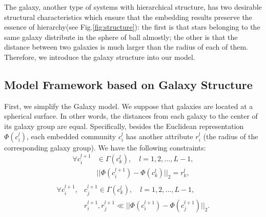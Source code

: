 \documentclass{article}
\theoremstyle{definition}
\begin{document}
	 The galaxy, another type of systems with hierarchical structure, has two desirable structural characteristics which ensure that the embedding results preserve the essence of hierarchy(see Fig.\ref{fig:structure}): the first is that stars belonging to the same galaxy distribute in the sphere of ball almostly; the other is that the distance between two galaxies is much larger than the radius of each of them.
	 Therefore, we introduce the galaxy structure into our model. 
	 
	 \subsection{Model Framework based on Galaxy Structure}
	 First, we simplify the Galaxy model. We suppose that galaxies are located at a spherical surface. In other words, the distances from each galaxy to the center of its galaxy group are equal. Specifically, besides the Euclidean representation $\Phi(c_i^l)$, each embedded community $c_i^l$ has another attribute $r_i^l$ (the radius of the corresponding galaxy group). We have the following constraints:
	 \begin{equation}
	 \begin{split}
	 	\label{equ:sphere_constraints}
	 	\forall c_i^{l+1} & \in \Gamma(c_k^l), \quad l = 1, 2, ..., L - 1,\\
	 	& ||\Phi(c_i^{l+1})  - \Phi(c_k^l)||_2= r_k^l, \\	
	 \end{split}
	 \end{equation}
	 \begin{equation}
	 \label{equ:galaxy_constraints}
	 \begin{split}
	 	\forall c_i^{l+1}, & c_j^{l+1} \in \Gamma(c_k^l), \quad l = 1, 2, ..., L - 1,\\
	 	&r_i^{l+1}, r_j^{l+1} \ll ||\Phi(c_i^{l+1}) - \Phi(c_j^{l+1})||_2. \\	
	 \end{split}
	 \end{equation}
\end{document}
